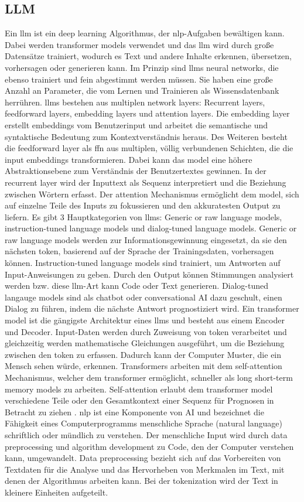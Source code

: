 \subsection{LLM}
Ein \gls{llm} ist ein deep learning Algorithmus, der \gls{nlp}-Aufgaben bewältigen kann. Dabei werden transformer models verwendet und das \gls{llm} wird durch große Datensätze trainiert, wodurch es Text und andere Inhalte erkennen, übersetzen, vorhersagen oder generieren kann. Im Prinzip sind \gls{llm}s neural networks, die ebenso trainiert und fein abgestimmt werden müssen. Sie haben eine große Anzahl an Parameter, die vom Lernen und Trainieren als Wissensdatenbank herrühren. \gls{llm}s bestehen aus multiplen network layers: Recurrent layers, feedforward layers, embedding layers und attention layers. Die embedding layer erstellt embeddings vom Benutzerinput und arbeitet die semantische und syntaktische Bedeutung zum Kontextverständnis heraus. Des Weiteren besteht die feedforward layer als \gls{ffn} aus multiplen, völlig verbundenen Schichten, die die input embeddings transformieren. Dabei kann das model eine höhere Abstraktionsebene zum Verständnis der Benutzertextes gewinnen. In der recurrent layer wird der Inputtext als Sequenz interpretiert und die Beziehung zwischen Wörtern erfasst. Der attention Mechanismus ermöglicht dem model, sich auf einzelne Teile des Inputs zu fokussieren und den akkuratesten Output zu liefern. Es gibt 3 Hauptkategorien von \gls{llm}s: Generic or raw language models, instruction-tuned language models und dialog-tuned language models. Generic or raw language models werden zur Informationsgewinnung eingesetzt, da sie den nächsten token, basierend auf der Sprache der Trainingsdaten, vorhersagen können. Instruction-tuned language models sind trainiert, um Antworten auf Input-Anweisungen zu geben. Durch den Output können Stimmungen analysiert werden bzw. diese \gls{llm}-Art kann Code oder Text generieren. Dialog-tuned langauge models sind als chatbot oder conversational AI dazu geschult, einen Dialog zu führen, indem die nächste Antwort prognostiziert wird. Ein transformer model ist die gängigste Architektur eines \gls{llm}s und besteht aus einem Encoder und Decoder. Input-Daten werden durch Zuweisung von token verarbeitet und gleichzeitig werden mathematische Gleichungen ausgeführt, um die Beziehung zwischen den token zu erfassen. Dadurch kann der Computer Muster, die ein Mensch sehen würde, erkennen. Transformers arbeiten mit dem self-attention Mechanismus, welcher dem transformer ermöglicht, schneller als long short-term memory models zu arbeiten. Self-attention erlaubt dem transformer model verschiedene Teile oder den Gesamtkontext einer Sequenz für Prognosen in Betracht zu ziehen \cite{llm-def}. \gls{nlp} ist eine Komponente von AI und bezeichnet die Fähigkeit eines Computerprogramms menschliche Sprache (natural language) schriftlich oder mündlich zu verstehen. Der menschliche Input wird durch data preprocessing und algorithm development zu Code, den der Computer verstehen kann, umgewandelt. Data preprocessing bezieht sich auf das Vorbereiten von Textdaten für die Analyse und das Hervorheben von Merkmalen im Text, mit denen der Algorithmus arbeiten kann. Bei der tokenization wird der Text in kleinere Einheiten aufgeteilt. 